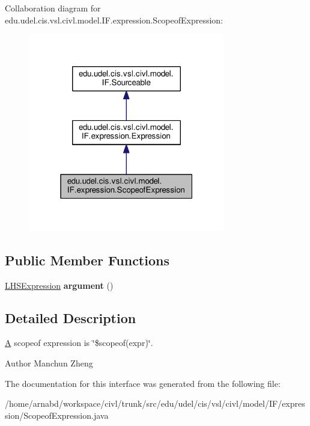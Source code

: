 Collaboration diagram for edu.\+udel.\+cis.\+vsl.\+civl.\+model.\+I\+F.\+expression.\+Scopeof\+Expression\+:
\nopagebreak
\begin{figure}[H]
\begin{center}
\leavevmode
\includegraphics[width=244pt]{interfaceedu_1_1udel_1_1cis_1_1vsl_1_1civl_1_1model_1_1IF_1_1expression_1_1ScopeofExpression__coll__graph}
\end{center}
\end{figure}
\subsection*{Public Member Functions}
\begin{DoxyCompactItemize}
\item 
\hypertarget{interfaceedu_1_1udel_1_1cis_1_1vsl_1_1civl_1_1model_1_1IF_1_1expression_1_1ScopeofExpression_ab4982042c29ea6074292560f07b1b597}{}\hyperlink{interfaceedu_1_1udel_1_1cis_1_1vsl_1_1civl_1_1model_1_1IF_1_1expression_1_1LHSExpression}{L\+H\+S\+Expression} {\bfseries argument} ()\label{interfaceedu_1_1udel_1_1cis_1_1vsl_1_1civl_1_1model_1_1IF_1_1expression_1_1ScopeofExpression_ab4982042c29ea6074292560f07b1b597}

\end{DoxyCompactItemize}


\subsection{Detailed Description}
\hyperlink{structA}{A} scopeof expression is \char`\"{}\$scopeof(expr)\char`\"{}. 

\begin{DoxyAuthor}{Author}
Manchun Zheng 
\end{DoxyAuthor}


The documentation for this interface was generated from the following file\+:\begin{DoxyCompactItemize}
\item 
/home/arnabd/workspace/civl/trunk/src/edu/udel/cis/vsl/civl/model/\+I\+F/expression/Scopeof\+Expression.\+java\end{DoxyCompactItemize}
